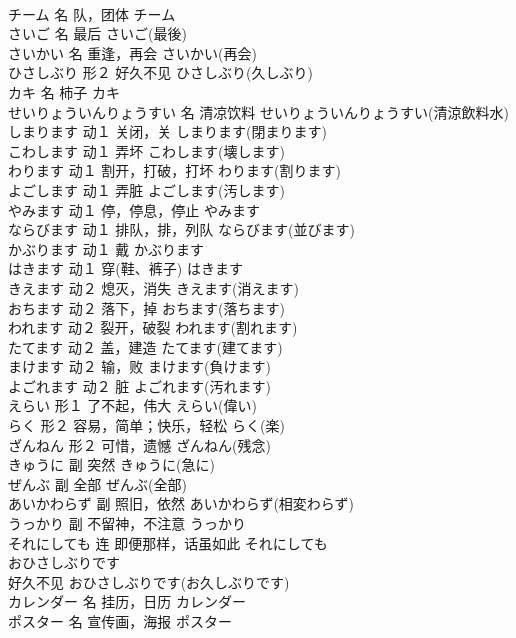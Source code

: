 \documentclass[8pt]{extreport}
\begin{document}
\begin{CJK}{UTF8}{min}
\\	チーム	名	队，团体	チーム	
\\	さいご	名	最后	さいご(最後)	
\\	さいかい	名	重逢，再会	さいかい(再会)	
\\	ひさしぶり	形２	好久不见	ひさしぶり(久しぶり)	
\\	カキ	名	柿子	カキ	
\\	せいりょういんりょうすい	名	清凉饮料	せいりょういんりょうすい(清涼飲料水)	
\\	しまります	动１	关闭，关	しまります(閉まります)	
\\	こわします	动１	弄坏	こわします(壊します)	
\\	わります	动１	割开，打破，打坏	わります(割ります)	
\\	よごします	动１	弄脏	よごします(汚します)	
\\	やみます	动１	停，停息，停止	やみます	
\\	ならびます	动１	排队，排，列队	ならびます(並びます)	
\\	かぶります	动１	戴	かぶります	
\\	はきます	动１	穿(鞋、裤子)	はきます	
\\	きえます	动２	熄灭，消失	きえます(消えます)	
\\	おちます	动２	落下，掉	おちます(落ちます)	
\\	われます	动２	裂开，破裂	われます(割れます)	
\\	たてます	动２	盖，建造	たてます(建てます)	
\\	まけます	动２	输，败	まけます(負けます)	
\\	よごれます	动２	脏	よごれます(汚れます)	
\\	えらい	形１	了不起，伟大	えらい(偉い)	
\\	らく	形２	容易，简单；快乐，轻松	らく(楽)	
\\	ざんねん	形２	可惜，遗憾	ざんねん(残念)	
\\	きゅうに	副	突然	きゅうに(急に)	
\\	ぜんぶ	副	全部	ぜんぶ(全部)	
\\	あいかわらず	副	照旧，依然	あいかわらず(相変わらず)	
\\	うっかり	副	不留神，不注意	うっかり	
\\	それにしても	连	即便那样，话虽如此	それにしても	
\\	おひさしぶりです	
\\	好久不见	おひさしぶりです(お久しぶりです)	
\\	カレンダー	名	挂历，日历	カレンダー	
\\	ポスター	名	宣传画，海报	ポスター	

\end{CJK}
\end{document}
